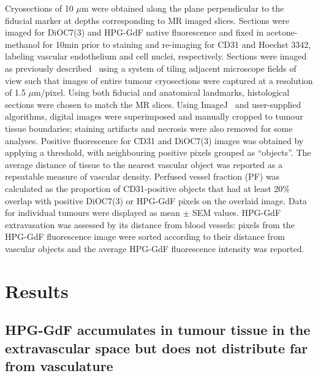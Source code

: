 Cryosections of 10 $\mu$m were obtained along the plane perpendicular to the fiducial marker at depths corresponding to MR imaged slices.
Sections were imaged for DiOC7(3) and \acs{HPG-GdF} native fluorescence and fixed in acetone-methanol for 10min prior to staining and re-imaging for \acs{CD31} and Hoechst 3342, labeling vascular endothelium and cell nuclei, respectively.
Sections were imaged as previously described~\cite{Kyle:2007ch} using a system of tiling adjacent microscope fields of view such that images of entire tumour cryosections were captured at a resolution of 1.5 $\mu$m/pixel.
Using both fiducial and anatomical landmarks, histological sections were chosen to match the MR slices.
Using ImageJ~\cite{Collins:2007jr} and user-supplied algorithms, digital images were superimposed and manually cropped to tumour tissue boundaries; staining artifacts and necrosis were also removed for some analyses.
Positive fluorescence for \acs{CD31} and DiOC7(3) images was obtained by applying a threshold, with neighbouring positive pixels grouped as ``objects''.
The average distance of tissue to the nearest vascular object was reported as a repeatable measure of vascular density.
Perfused vessel fraction (PF) was calculated as the proportion of \acs{CD31}-positive objects that had at least 20\% overlap with positive DiOC7(3) or \acs{HPG-GdF} pixels on the overlaid image.
Data for individual tumours were displayed as mean $\pm$ SEM values.
HPG-GdF extravasation was assessed by its distance from blood vessels: pixels from the \acs{HPG-GdF} fluorescence image were sorted according to their distance from vascular objects and the average \acs{HPG-GdF} fluorescence intensity was reported.

\section{Results}

\subsection{HPG-GdF accumulates in tumour tissue in the extravascular space but does not distribute far from vasculature}

